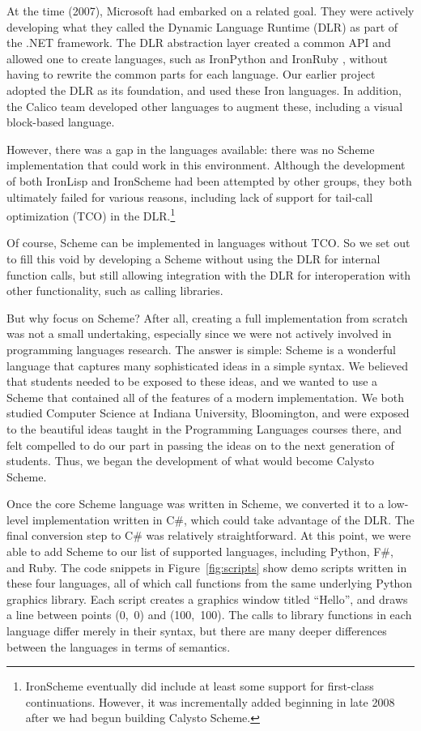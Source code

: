 \documentclass[acmsmall,screen,nonacm]{acmart}
\begin{document}
At the time (2007), Microsoft had embarked on a related goal. They were
actively developing what they called the Dynamic Language Runtime (DLR) as part
of the .NET framework. The DLR abstraction layer created a common API and
allowed one to create languages, such as IronPython and IronRuby
\cite{IronRuby}, without having to rewrite the common parts for each
language. Our earlier project adopted the DLR as its foundation, and used these
Iron languages. In addition, the Calico team developed other languages to
augment these, including a visual block-based language.

However, there was a gap in the languages available: there was no
Scheme implementation that could work in this environment. Although
the development of both IronLisp and IronScheme \cite{IronScheme} had
been attempted by other groups, they both ultimately failed for
various reasons, including lack of support for tail-call optimization
(TCO) in the DLR.\footnote[1]{IronScheme eventually did include at
least some support for first-class continuations. However, it was
incrementally added beginning in late 2008
\cite{IronScheme-Continuations} after we had begun building Calysto
Scheme.}

Of course, Scheme can be implemented in languages without TCO. So we set out to
fill this void by developing a Scheme without using the DLR for internal
function calls, but still allowing integration with the DLR for interoperation
with other functionality, such as calling libraries.

But why focus on Scheme? After all, creating a full implementation from scratch
was not a small undertaking, especially since we were not actively involved in
programming languages research. The answer is simple: Scheme is a wonderful
language that captures many sophisticated ideas in a simple syntax. We believed
that students needed to be exposed to these ideas, and we wanted to use a
Scheme that contained all of the features of a modern implementation. We both
studied Computer Science at Indiana University, Bloomington, and were exposed
to the beautiful ideas taught in the Programming Languages courses there, and
felt compelled to do our part in passing the ideas on to the next generation of
students. Thus, we began the development of what would become Calysto Scheme.

Once the core Scheme language was written in Scheme, we converted it to a
low-level implementation written in C\#, which could take advantage of the
DLR. The final conversion step to C\# was relatively straightforward. At this
point, we were able to add Scheme to our list of supported languages, including
Python, F\#, and Ruby.  The code snippets in Figure~\ref{fig:scripts} show demo
scripts written in these four languages, all of which call functions from the
same underlying Python graphics library. Each script creates a graphics window
titled ``Hello'', and draws a line between points (0,~0) and (100,~100). The
calls to library functions in each language differ merely in their syntax, but
there are many deeper differences between the languages in terms of semantics.
\end{document}
